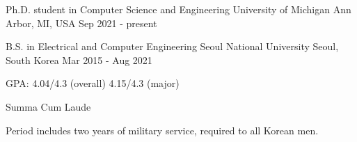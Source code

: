 

\begin{cventries}

  \cventry
    {Ph.D. student in Computer Science and Engineering}
    {University of Michigan} %
    {Ann Arbor, MI, USA} %
    {Sep 2021 - present} %
    {
    }

  \vspace{-5mm}
    
  \cventry
    {B.S. in Electrical and Computer Engineering}
    {Seoul National University} %
    {Seoul, South Korea} %
    {Mar 2015 - Aug 2021} %
    {
      \begin{cvitems} %
        \item {GPA: 4.04/4.3 (overall) 4.15/4.3 (major)}
        \item {Summa Cum Laude}
        \item {Period includes two years of military service, required to all Korean men.}
      \end{cvitems}
    }
    
\end{cventries}
